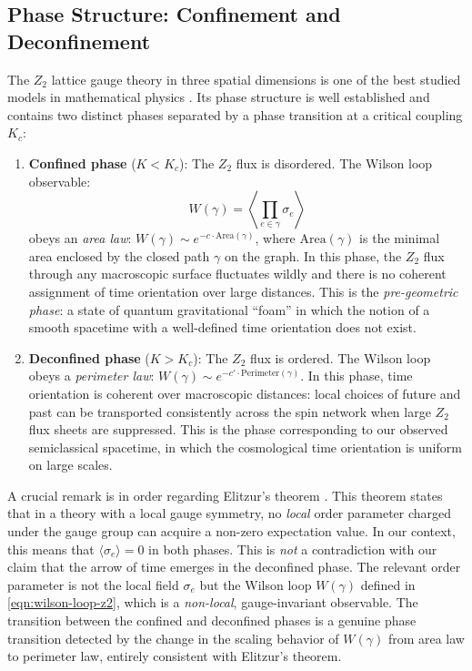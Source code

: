 \documentclass[preprint]{SciPost}
\newcommand{\expect}[1]{\langle #1\rangle}
\theoremstyle{plain} %
\begin{document}
\subsection{Phase Structure: Confinement and Deconfinement}\label{subsec:z2-phases}

The $ Z_2 $ lattice gauge theory in three spatial dimensions is one of the best studied models in mathematical physics \cite{Wegner1971Duality,Kogut1979An-introduction,Fradkin1979Phase}. Its phase structure is well established and contains two distinct phases separated by a phase transition at a critical coupling $ K_c $:

\begin{enumerate}
	\item \textbf{Confined phase} ($ K < K_c $): The $ Z_2 $ flux is disordered. The Wilson loop observable:
	\begin{equation}\label{eqn:wilson-loop-z2}
		W(\gamma) = \left\langle \prod_{e \in \gamma} \sigma_e \right\rangle
	\end{equation}
	obeys an \emph{area law}: $ W(\gamma) \sim e^{-c \cdot \text{Area}(\gamma)} $, where $ \text{Area}(\gamma) $ is the minimal area enclosed by the closed path $ \gamma $ on the graph. In this phase, the $ Z_2 $ flux through any macroscopic surface fluctuates wildly and there is no coherent assignment of time orientation over large distances. This is the \emph{pre-geometric phase}: a state of quantum gravitational ``foam'' in which the notion of a smooth spacetime with a well-defined time orientation does not exist.

	\item \textbf{Deconfined phase} ($ K > K_c $): The $ Z_2 $ flux is ordered. The Wilson loop obeys a \emph{perimeter law}: $ W(\gamma) \sim e^{-c' \cdot \text{Perimeter}(\gamma)} $. In this phase, time orientation is coherent over macroscopic distances: local choices of future and past can be transported consistently across the spin network when large $Z_2$ flux sheets are suppressed. This is the phase corresponding to our observed semiclassical spacetime, in which the cosmological time orientation is uniform on large scales.
\end{enumerate}

A crucial remark is in order regarding Elitzur's theorem \cite{Elitzur1975Impossibility}. This theorem states that in a theory with a local gauge symmetry, no \emph{local} order parameter charged under the gauge group can acquire a non-zero expectation value. In our context, this means that $ \expect{\sigma_e} = 0 $ in both phases. This is \emph{not} a contradiction with our claim that the arrow of time emerges in the deconfined phase. The relevant order parameter is not the local field $ \sigma_e $ but the Wilson loop $ W(\gamma) $ defined in \eqref{eqn:wilson-loop-z2}, which is a \emph{non-local}, gauge-invariant observable. The transition between the confined and deconfined phases is a genuine phase transition detected by the change in the scaling behavior of $ W(\gamma) $ from area law to perimeter law, entirely consistent with Elitzur's theorem.
\end{document}

